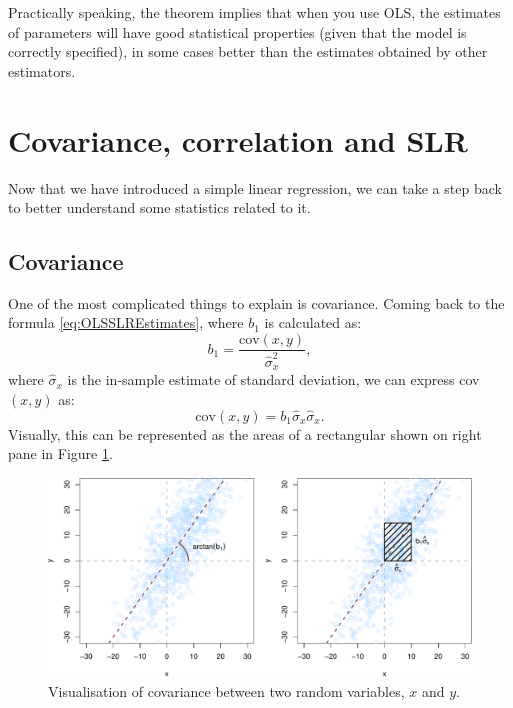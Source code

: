 \documentclass[
]{book}
\theoremstyle{definition}
\theoremstyle{definition}
\theoremstyle{definition}
\theoremstyle{definition}
\theoremstyle{remark}
\begin{document}
Practically speaking, the theorem implies that when you use OLS, the estimates of parameters will have good statistical properties (given that the model is correctly specified), in some cases better than the estimates obtained by other estimators.

\hypertarget{SLRCovariance}{%
\section{Covariance, correlation and SLR}\label{SLRCovariance}}

Now that we have introduced a simple linear regression, we can take a step back to better understand some statistics related to it.

\hypertarget{covariance}{%
\subsection{Covariance}\label{covariance}}

One of the most complicated things to explain is covariance. Coming back to the formula \eqref{eq:OLSSLREstimates}, where \(b_1\) is calculated as:
\begin{equation*}
    {b}_1 = \frac{\mathrm{cov}(x,y)}{\hat{\sigma}_x^2} ,
\end{equation*}
where \(\hat{\sigma}_x\) is the in-sample estimate of standard deviation, we can express cov\((x,y)\) as:
\begin{equation*}
    \mathrm{cov}(x,y) = {b}_1 \hat{\sigma}_x \hat{\sigma}_x .
\end{equation*}
Visually, this can be represented as the areas of a rectangular shown on right pane in Figure \ref{fig:covarianceVisual}.

\begin{figure}
\centering
\includegraphics{Svetunkov---Statistics-for-Business-Analytics_files/figure-latex/covarianceVisual-1.pdf}
\caption{\label{fig:covarianceVisual}Visualisation of covariance between two random variables, \(x\) and \(y\).}
\end{figure}
\end{document}
